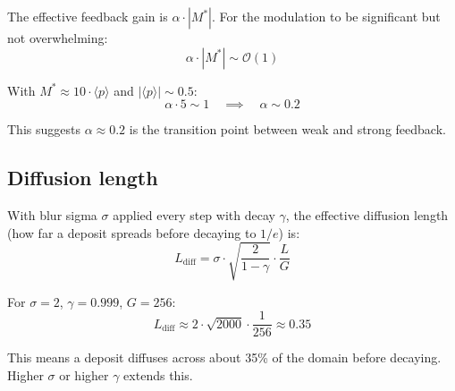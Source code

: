 \documentclass[11pt,a4paper]{article}
\begin{document}
The effective feedback gain is $\alpha \cdot |M^*|$. For the modulation to be significant but not overwhelming:
\begin{equation}
\alpha \cdot |M^*| \sim \mathcal{O}(1)
\end{equation}

With $M^* \approx 10 \cdot \langle p \rangle$ and $|\langle p \rangle| \sim 0.5$:
\begin{equation}
\alpha \cdot 5 \sim 1 \quad\implies\quad \alpha \sim 0.2
\end{equation}

This suggests $\alpha \approx 0.2$ is the transition point between weak and strong feedback.

\subsection{Diffusion length}

With blur sigma $\sigma$ applied every step with decay $\gamma$, the effective diffusion length (how far a deposit spreads before decaying to $1/e$) is:
\begin{equation}
L_{\mathrm{diff}} = \sigma \cdot \sqrt{\frac{2}{1 - \gamma}} \cdot \frac{L}{G}
\end{equation}

For $\sigma = 2$, $\gamma = 0.999$, $G = 256$:
\begin{equation}
L_{\mathrm{diff}} \approx 2 \cdot \sqrt{2000} \cdot \frac{1}{256} \approx 0.35
\end{equation}

This means a deposit diffuses across about 35\% of the domain before decaying. Higher $\sigma$ or higher $\gamma$ extends this.
\end{document}
